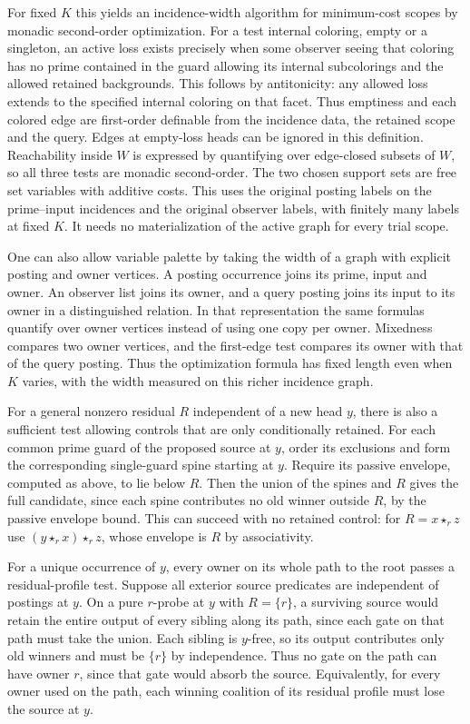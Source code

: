 For fixed $K$ this yields an incidence-width
algorithm for minimum-cost scopes by monadic
second-order optimization. For a test internal
coloring, empty or a singleton, an active loss
exists precisely when some observer seeing that
coloring has no prime contained in the guard
allowing its internal subcolorings and the
allowed retained backgrounds. This follows by
antitonicity: any allowed loss extends to the
specified internal coloring on that facet.
Thus emptiness and each colored edge are
first-order definable from the incidence data,
the retained scope and the query. Edges at
empty-loss heads can be ignored in this
definition. Reachability inside $W$ is expressed
by quantifying over edge-closed subsets of $W$,
so all three tests are monadic second-order.
The two chosen support sets are free set
variables with additive costs. This uses the
original posting labels on the prime--input
incidences and the original observer labels,
with finitely many labels at fixed $K$.
It needs no materialization of the active
graph for every trial scope.

One can also allow variable palette by taking
the width of a graph with explicit posting
and owner vertices. A posting occurrence joins
its prime, input and owner. An observer list
joins its owner, and a query posting joins
its input to its owner in a distinguished
relation. In that representation the same
formulas quantify over owner vertices instead
of using one copy per owner. Mixedness compares
two owner vertices, and the first-edge test
compares its owner with that of the query
posting. Thus the optimization formula has
fixed length even when $K$ varies, with the
width measured on this richer incidence graph.

For a general nonzero residual $R$ independent of a new head
$y$, there is also a sufficient test allowing controls that
are only conditionally retained. For each common prime guard
of the proposed source at $y$, order its exclusions and form
the corresponding single-guard spine starting at $y$. Require
its passive envelope, computed as above, to lie below $R$. Then
the union of the spines and $R$ gives the full candidate, since
each spine contributes no old winner outside $R$, by the
passive envelope bound. This can succeed with no retained
control: for $R=x\star_r z$ use $(y\star_r x)\star_r z$,
whose envelope is $R$ by associativity.

For a unique occurrence of $y$, every owner on its whole path
to the root passes a residual-profile test. Suppose all exterior
source predicates are independent of postings at $y$. On a pure
$r$-probe at $y$ with $R=\{r\}$, a surviving source would
retain the entire output of every sibling along its path, since
each gate on that path must take the union. Each sibling is
$y$-free, so its output contributes only old winners and must
be $\{r\}$ by independence. Thus no gate on the path can have
owner $r$, since that gate would absorb the source. Equivalently,
for every owner used on the path, each winning coalition of
its residual profile must lose the source at $y$.

